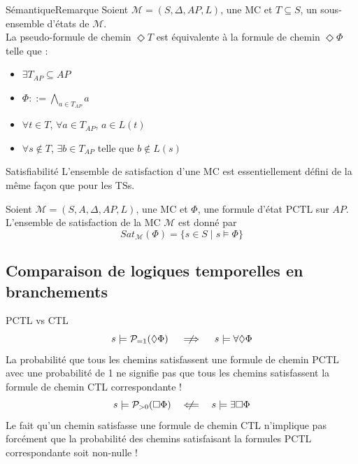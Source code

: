 \documentclass[compress]{beamer}
\begin{document}
\begin{frame}{Sémantique}{Remarque}
  Soient $\mathcal{M} = (S, \Delta, AP, L)$, une MC et $T \subseteq S$, un sous-ensemble d'états de $\mathcal{M}$. \\
  La pseudo-formule de chemin $\Diamond T$ est équivalente à la formule de chemin $\Diamond \Phi$ telle que :
  \begin{itemize}
    \item $\exists T_{AP} \subseteq AP$
    \item $\Phi ::= \bigwedge_{a \in T_{AP}} a$
    \item $\forall t \in T$, $\forall a \in T_{AP}$, $a \in L(t)$
    \item $\forall s \not \in T$, $\exists b \in T_{AP}$ telle que $b \not \in L(s)$
  \end{itemize}
\end{frame}

\begin{frame}{Satisfiabilité}
  L'ensemble de satisfaction d'une MC est essentiellement défini de la même façon que pour les TSs.
  \begin{definition}
    Soient $\mathcal{M} = (S, A, \Delta, AP, L)$, une MC et
    $\Phi$, une formule d'état PCTL sur $AP$. L'ensemble
    de satisfaction de la MC $\mathcal{M}$ est donné par
    \[
      Sat_\mathcal{M}(\Phi) = \{s \in S \; | \; s \models \Phi \}
    \]
  \end{definition}
\end{frame}

\subsection{Comparaison de logiques temporelles en branchements}
\begin{frame}{PCTL vs CTL}
\[
  s \models \mathcal{P}_{=1}(\Diamond \Phi) \quad  \centernot\implies \quad s \models \forall \Diamond \Phi
\]
\alert{La probabilité que tous les chemins satisfassent une formule de chemin PCTL avec une probabilité de 1 ne signifie pas que tous les chemins satisfassent la formule de chemin CTL correspondante !}
\[
  s \models \mathcal{P}_{>0}(\Box \Phi) \quad  \centernot\Longleftarrow \quad s \models \exists \Box \Phi
\]
\alert{Le fait qu'un chemin satisfasse une formule de chemin CTL n'implique pas forcément que la probabilité des chemins satisfaisant la formules PCTL correspondante soit non-nulle !}
\end{frame}
\end{document}
